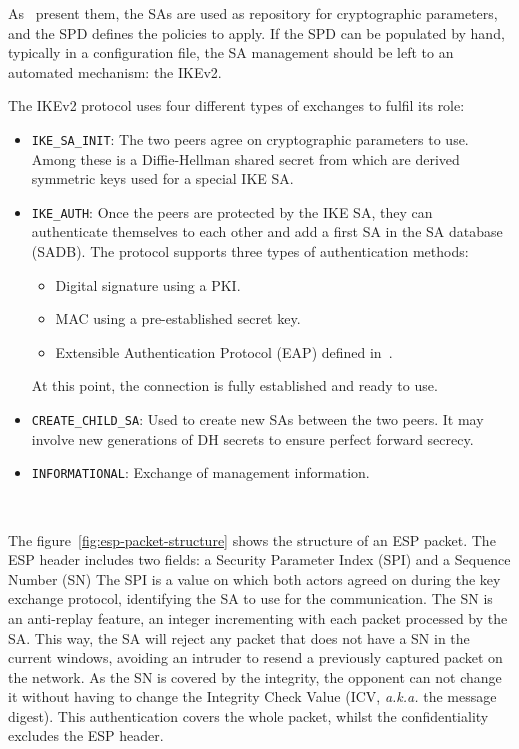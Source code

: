 As~\citet{Paterson200672} present them, the SAs are used as repository for cryptographic parameters, and the SPD defines the policies to apply.
If the SPD can be populated by hand, typically in a configuration file, the SA management should be left to an automated mechanism: the IKEv2.

\noindent The IKEv2 protocol uses four different types of exchanges to fulfil its role:
\begin{itemize}
	\item \texttt{IKE\_SA\_INIT}: The two peers agree on cryptographic parameters to use. Among these is a Diffie-Hellman shared secret from which are derived symmetric keys used for a special IKE SA.
	\item \texttt{IKE\_AUTH}: Once the peers are protected by the IKE SA, they can authenticate themselves to each other and add a first SA in the SA database (SADB).
	The protocol supports three types of authentication methods:
	\begin{itemize}
		\item Digital signature using a PKI.
		\item MAC using a pre-established secret key.
		\item Extensible Authentication Protocol (EAP) defined in~\citet{rfc3748}.
	\end{itemize}
	At this point, the connection is fully established and ready to use.
	\item \texttt{CREATE\_CHILD\_SA}: Used to create new SAs between the two peers. It may involve new generations of DH secrets to ensure perfect forward secrecy.
	\item \texttt{INFORMATIONAL}: Exchange of management information.
\end{itemize}
~\newline{}

The figure~\ref{fig:esp-packet-structure} shows the structure of an ESP packet.
The ESP header includes two fields: a Security Parameter Index (SPI) and a Sequence Number (SN)
The SPI is a value on which both actors agreed on during the key exchange protocol, identifying the SA to use for the communication.
The SN is an anti-replay feature, an integer incrementing with each packet processed by the SA. This way, the SA will reject any packet that does not have a SN in the current windows, avoiding an intruder to resend a previously captured packet on the network.
As the SN is covered by the integrity, the opponent can not change it without having to change the Integrity Check Value (ICV, \textit{a.k.a.} the message digest).
This authentication covers the whole packet, whilst the confidentiality excludes the ESP header.

